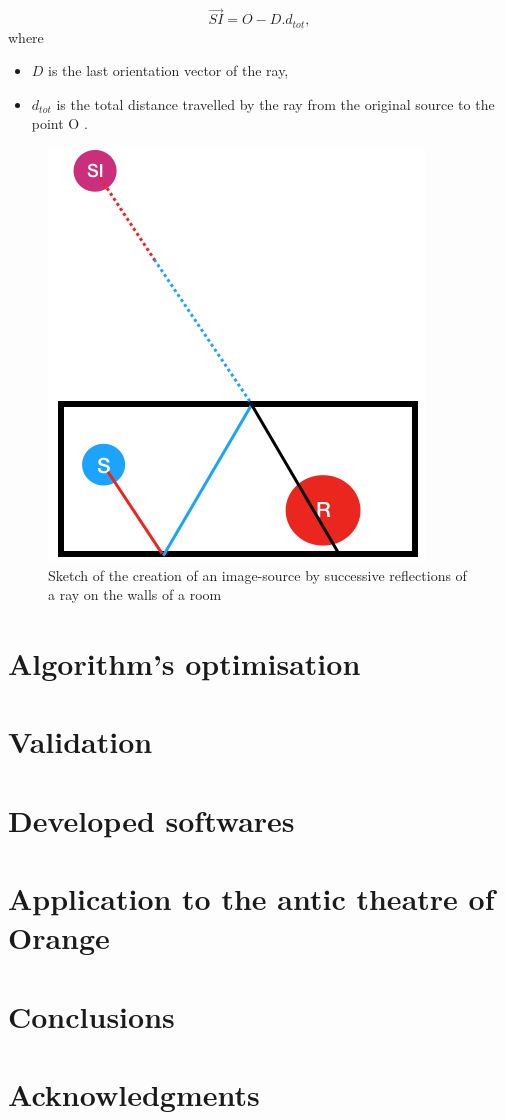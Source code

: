 \documentclass[AMA,STIX1COL]{WileyNJD-v2}
\begin{document}
\begin{equation}
\overrightarrow{SI} = O - D.d_{tot},
\end{equation}
where 
\begin{itemize}
\item $D$ is the last orientation vector of the ray,
\item $d_{tot}$ is the total distance travelled by the ray from the original source to the point O .
\end{itemize}

\begin{figure}
\centering
	\includegraphics[width=0.3\linewidth]{schema_SI}
	\caption{Sketch of the creation of an image-source by successive reflections of a ray on the walls of a room}
	\label{schema_SI}
\end{figure}

\section{Algorithm's optimisation}\label{sec4}

\section{Validation}\label{sec5}

\section{Developed softwares }\label{sec6}

\section{Application to the antic theatre of Orange}\label{sec7}


\section{Conclusions}

\section*{Acknowledgments}
\end{document}
